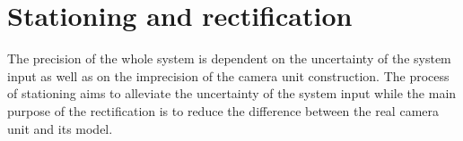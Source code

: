 %
%	
%
%
		

\chapter{Stationing and rectification} \label{txt:stationing_and_rectification}

The precision of the whole system is dependent on the uncertainty of the system input as well as on the imprecision of the camera unit construction. The process of stationing aims to alleviate the uncertainty of the system input while the main purpose of the rectification is to reduce the difference between the real camera unit and its model.

